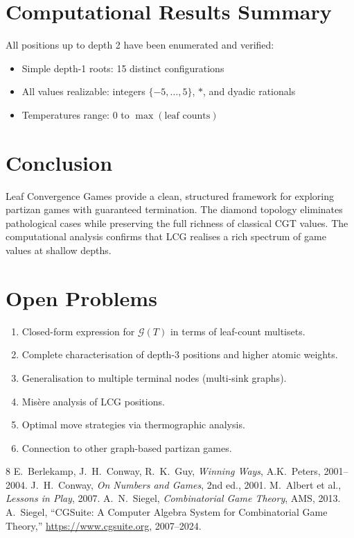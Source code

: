 \documentclass[10pt,a4paper,twocolumn]{article}
\newcommand{\Gv}[1]{\mathcal{G}(#1)}
\theoremstyle{plain}
\theoremstyle{definition}
\theoremstyle{remark}
\begin{document}
\section{Computational Results Summary}

All positions up to depth 2 have been enumerated and verified:
\begin{itemize}
\item Simple depth-1 roots: 15 distinct configurations
\item All values realizable: integers $\{-5, \ldots, 5\}$, $*$, and dyadic rationals
\item Temperatures range: $0$ to $\max(\text{leaf counts})$
\end{itemize}

\section{Conclusion}

Leaf Convergence Games provide a clean, structured framework for exploring partizan games with guaranteed termination. The diamond topology eliminates pathological cases while preserving the full richness of classical CGT values. The computational analysis confirms that LCG realises a rich spectrum of game values at shallow depths.

\section{Open Problems}

\begin{enumerate}[label=(\roman*)]
\item Closed-form expression for $\Gv{T}$ in terms of leaf-count multisets.
\item Complete characterisation of depth-3 positions and higher atomic weights.
\item Generalisation to multiple terminal nodes (multi-sink graphs).
\item Misère analysis of LCG positions.
\item Optimal move strategies via thermographic analysis.
\item Connection to other graph-based partizan games.
\end{enumerate}

\vspace{12pt}

\begin{thebibliography}{8}
 E.~Berlekamp, J.~H.~Conway, R.~K.~Guy, \textit{Winning Ways}, A.K.~Peters, 2001--2004.
 J.~H.~Conway, \textit{On Numbers and Games}, 2nd ed., 2001.
 M.~Albert et al., \textit{Lessons in Play}, 2007.
 A.~N.~Siegel, \textit{Combinatorial Game Theory}, AMS, 2013.
 A.~Siegel, ``CGSuite: A Computer Algebra System for Combinatorial Game Theory,'' \url{https://www.cgsuite.org}, 2007--2024.
\end{thebibliography}
\end{document}

